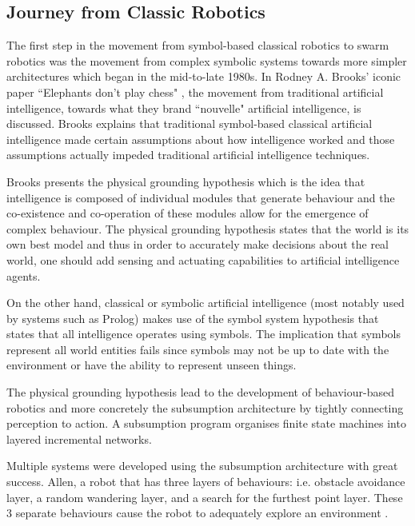 \subsection{Journey from Classic Robotics}
\label{journeyfromtraditionalAI}

The first step in the movement from symbol-based classical robotics to swarm robotics was the movement from complex symbolic systems towards more simpler architectures which began in the mid-to-late 1980s. In Rodney A. Brooks' iconic paper ``Elephants don't play chess" \cite{brooks1990elephants}, the movement from traditional artificial intelligence, towards what they brand ``nouvelle" artificial intelligence, is discussed. Brooks explains that traditional symbol-based classical artificial intelligence made certain assumptions about how intelligence worked and those assumptions actually impeded traditional artificial intelligence techniques. 

Brooks presents the physical grounding hypothesis which is the idea that intelligence is composed of individual modules that generate behaviour and the co-existence and co-operation of these modules allow for the emergence of complex behaviour. The physical grounding hypothesis states that the world is its own best model and thus in order to accurately make decisions about the real world, one should add sensing and actuating capabilities to artificial intelligence agents.

On the other hand, classical or symbolic artificial intelligence (most notably used by systems such as Prolog) makes use of the symbol system hypothesis that states that all intelligence operates using symbols. The implication that symbols represent all world entities fails since symbols may not be up to date with the environment or have the ability to represent unseen things. 

The physical grounding hypothesis lead to the development of behaviour-based robotics and more concretely the subsumption architecture \cite{brooks1986robust} by tightly connecting perception to action. A subsumption program organises finite state machines into layered incremental networks. 

Multiple systems were developed using the subsumption architecture with great success. Allen, a robot that has three layers of behaviours: i.e. obstacle avoidance layer, a random wandering layer, and a search for the furthest point layer. These 3 separate behaviours cause the robot to adequately explore an environment \cite{brooks1986robust}.

